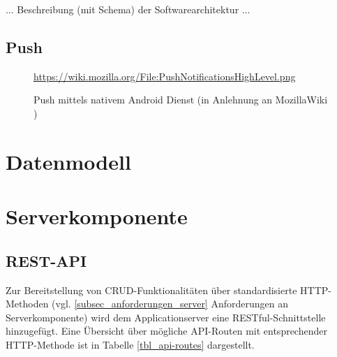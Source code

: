 ... Beschreibung (mit Schema) der Softwarearchitektur ...

\newpage
\subsection{Push}

\begin{figure}[htp] 
\caption{Push mittels nativem Android Dienst (in Anlehnung an MozillaWiki \cite{MOZ_WIKI})}
\quelle\url{https://wiki.mozilla.org/File:PushNotificationsHighLevel.png}
\label{image_architektur-android-push}
\end{figure}  

\section{Datenmodell}
\label{subsec_datenmodell}



\section{Serverkomponente}
\label{subsec_serverkomponente}

\subsection{REST-API}

Zur Bereitstellung von CRUD-Funktionalitäten über standardisierte HTTP-Methoden (vgl. \ref{subsec_anforderungen_server} Anforderungen an Serverkomponente) wird dem Applicationserver eine RESTful-Schnittstelle hinzugefügt. Eine Übersicht über mögliche API-Routen mit entsprechender HTTP-Methode ist in Tabelle \ref{tbl_api-routes} dargestellt. \\

